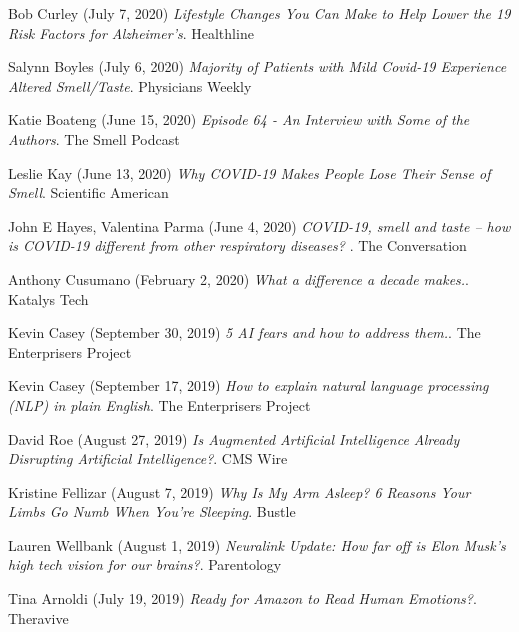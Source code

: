 \documentclass[10pt]{cooperCV2}
\begin{document}
\begin{etaremune}[itemindent=-1.5\bibhang, topsep=0pt,
				   itemsep=\bibsep,partopsep=0pt,parsep=0pt,leftmargin={\bibhang+\widthof{[999]}}]
	
    \item Bob Curley (July 7, 2020) \textit{Lifestyle Changes You Can Make to Help Lower the 19 Risk Factors for Alzheimer’s}. Healthline
     
	
    \item Salynn Boyles (July 6, 2020) \textit{Majority of Patients with Mild Covid-19 Experience Altered Smell/Taste}. Physicians Weekly
     
	
    \item Katie Boateng (June 15, 2020) \textit{Episode 64 - An Interview with Some of the Authors}. The Smell Podcast
     
	
    \item Leslie Kay (June 13, 2020) \textit{Why COVID-19 Makes People Lose Their Sense of Smell}. Scientific American
     
	
    \item John E Hayes, Valentina Parma (June 4, 2020) \textit{COVID-19, smell and taste – how is COVID-19 different from other respiratory diseases? }. The Conversation
     
	
    \item Anthony Cusumano (February 2, 2020) \textit{What a difference a decade makes.}. Katalys Tech
     
	
    \item Kevin Casey (September 30, 2019) \textit{5 AI fears and how to address them.}. The Enterprisers Project
     
	
    \item Kevin Casey (September 17, 2019) \textit{How to explain natural language processing (NLP) in plain English}. The Enterprisers Project
     
	
    \item David Roe (August 27, 2019) \textit{Is Augmented Artificial Intelligence Already Disrupting Artificial Intelligence?}. CMS Wire
     
	
    \item Kristine Fellizar (August 7, 2019) \textit{Why Is My Arm Asleep? 6 Reasons Your Limbs Go Numb When You're Sleeping}. Bustle
     
	
    \item Lauren Wellbank (August 1, 2019) \textit{Neuralink Update: How far off is Elon Musk’s high tech vision for our brains?}. Parentology
     
	
    \item Tina Arnoldi (July 19, 2019) \textit{Ready for Amazon to Read Human Emotions?}. Theravive
     

\end{etaremune}
\end{document}
